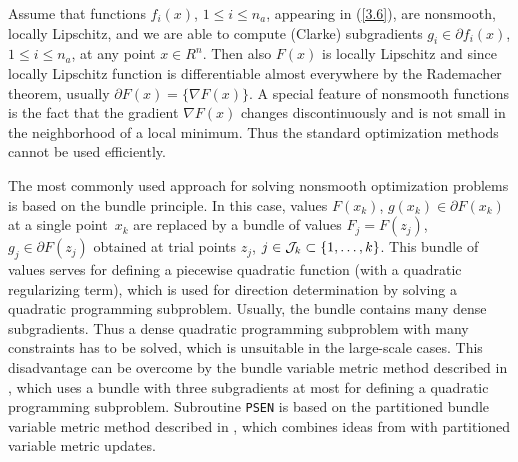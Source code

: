 \documentclass{esub2acm}
\begin{document}
\vspace{5mm}


\vspace{3mm}

\noindent Assume that functions $f_i(x)$, $1 \leq i \leq n_a$, appearing
in (\ref{3.6}), are nonsmooth, locally Lipschitz, and we are able to compute
(Clarke) subgradients $g_i \in \partial f_i(x)$, $1 \leq i \leq n_a$,
at any point $x \in R^n$. Then also $F(x)$ is locally Lipschitz and
since locally Lipschitz function is differentiable almost everywhere by
the Rademacher theorem, usually $\partial F(x) = \{\nabla F(x)\}$.
A special feature of nonsmooth functions is the fact that the gradient
$\nabla F(x)$ changes discontinuously and is not small in the neighborhood
of a local minimum. Thus the standard optimization methods cannot be used
efficiently.

The most commonly used approach for solving nonsmooth optimization
problems is based on the bundle principle. In this case, values
$F(x_k)$, $g(x_k) \in \partial F(x_k)$ at a single point~$x_k$ are
replaced by a bundle of values $F_j =  F(z_j)$,
$g_j \in \partial F(z_j)$ obtained at trial points $z_j$,
$j \in {\cal J}_k \subset \{ 1, \dots , k \}$. This bundle of values
serves for defining a piecewise quadratic function (with a quadratic
regularizing term), which is used for direction determination by
solving a quadratic programming subproblem. Usually, the bundle
contains many dense subgradients. Thus a dense quadratic programming
subproblem with many constraints has to be solved, which is unsuitable
in the large-scale cases. This disadvantage can be overcome by the bundle
variable metric method described in \cite{vll0}, which uses a bundle
with three subgradients at most for defining a quadratic programming
subproblem. Subroutine {\tt PSEN} is based on the partitioned bundle
variable metric method described in \cite{luv5}, which combines
ideas from \cite{vll0} with partitioned variable metric updates.
\end{document}
